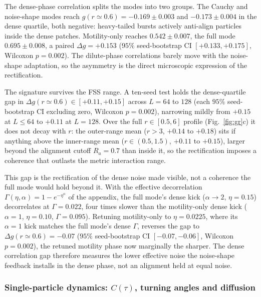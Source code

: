 \documentclass[11pt,a4paper]{article}
\begin{document}
The dense-phase correlation splits the modes into two groups.
The Cauchy and noise-shape modes reach $g(r \!\simeq\! 0.6) =
-0.169 \pm 0.003$ and $-0.173 \pm 0.004$ in the dense quartile,
both negative: heavy-tailed bursts actively anti-align
particles inside the dense patches. Motility-only reaches $0.542
\pm 0.007$, the full mode $0.695 \pm 0.008$, a paired $\Delta g
= +0.153$ ($95\%$ seed-bootstrap CI $[+0.133, +0.175]$, Wilcoxon
$p = 0.002$). The dilute-phase correlations barely move with
the noise-shape adaptation, so the asymmetry is the direct
microscopic expression of the rectification.

The signature survives the FSS range. A ten-seed test
holds the dense-quartile gap in $\Delta g(r \!\simeq\! 0.6)
\in [+0.11, +0.15]$ across $L = 64$ to $128$ (each $95\%$
seed-bootstrap CI excluding zero, Wilcoxon $p = 0.002$),
narrowing mildly from $+0.15$ at $L \le 64$ to $+0.11$ at
$L = 128$. Over the full $r \in [0.5, 6]$ profile
(Fig.~\ref{fig:gr}c) it does not decay with $r$: the outer-range
mean ($r > 3$, $+0.14$ to $+0.18$) sits if anything
above the inner-range mean ($r \in (0.5, 1.5)$, $+0.11$ to
$+0.15$), larger beyond the alignment cutoff $R_a = 0.7$ than
inside it, so the rectification imposes a coherence that
outlasts the metric interaction range.

This gap is the rectification of the dense noise made visible,
not a coherence the full mode would hold beyond it. With the
effective decorrelation $\Gamma(\eta, \alpha) = 1 -
e^{-\eta^\alpha}$ of the appendix, the full mode's dense kick
($\alpha \to 2$, $\eta = 0.15$) decorrelates at $\Gamma = 0.022$,
four times slower than the motility-only dense kick ($\alpha =
1$, $\eta = 0.10$, $\Gamma = 0.095$). Retuning motility-only to
$\eta = 0.0225$, where its $\alpha = 1$ kick matches the full
mode's dense $\Gamma$, reverses the gap to
$\Delta g(r \!\simeq\! 0.6) = -0.07$ ($95\%$ seed-bootstrap CI
$[-0.07, -0.06]$, Wilcoxon $p = 0.002$), the retuned
motility phase now marginally the sharper. The dense
correlation gap therefore measures the lower effective noise the
noise-shape feedback installs in the dense phase, not an
alignment held at equal noise.

\subsubsection{\texorpdfstring{Single-particle dynamics: $C(\tau)$, turning angles and diffusion}{Single-particle dynamics: C(tau), turning angles and diffusion}}
\label{sec:autocorr}
\end{document}
